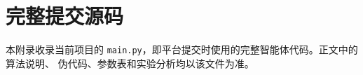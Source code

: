 \newpage
\appendix

\section{完整提交源码}

本附录收录当前项目的 \texttt{main.py}，即平台提交时使用的完整智能体代码。正文中的算法说明、
伪代码、参数表和实验分析均以该文件为准。


